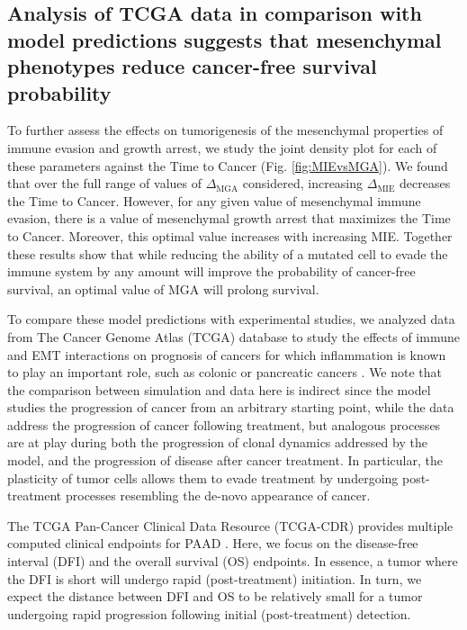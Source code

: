 \documentclass[11pt]{article}
\begin{document}
\subsection{Analysis of TCGA data in comparison with model predictions suggests that mesenchymal phenotypes reduce cancer-free survival probability}\label{tcga}


To further assess the effects on tumorigenesis of the mesenchymal properties of immune evasion and growth arrest, we study the joint density plot for each of these parameters against the Time to Cancer (Fig. \ref{fig:MIEvsMGA}). We found that over the full range of values of $\Delta_\text{MGA}$ considered, increasing $\Delta_\text{MIE}$ decreases the Time to Cancer. However, for any given value of mesenchymal immune evasion, there is a value of mesenchymal growth arrest that maximizes the Time to Cancer. Moreover, this optimal value increases with increasing MIE. Together these results show that while reducing the ability of a mutated cell to evade the immune system by any amount will improve the probability of cancer-free survival, an optimal value of MGA will prolong survival. 
\par
To compare these model predictions with experimental studies, we analyzed data from The Cancer Genome Atlas (TCGA) database to study the effects of immune and EMT interactions on prognosis of cancers for which inflammation is known to play an important role, such as colonic or pancreatic cancers \cite{greten2019inflammation,hu2010inflammation}.
We note that the comparison between simulation and data here is indirect since the model studies the progression of cancer from an arbitrary starting point, while the data address the progression of cancer following treatment, but analogous processes are at play during both the progression of  clonal dynamics addressed by the model, and the progression of disease after cancer treatment.
In particular, the plasticity of tumor cells allows them to evade treatment by undergoing post-treatment processes resembling the de-novo appearance of cancer\cite{sanchez2018slow}.
\par 
The TCGA Pan-Cancer Clinical Data Resource (TCGA-CDR) provides multiple computed clinical endpoints for PAAD \cite{liu2018integrated}.
Here, we focus on the disease-free interval (DFI) and the overall survival (OS) endpoints.
In essence, a tumor where the DFI is short will undergo rapid (post-treatment) initiation.
In turn, we expect the distance between DFI and OS to be relatively small for a tumor undergoing rapid progression following initial (post-treatment) detection.
\end{document}
